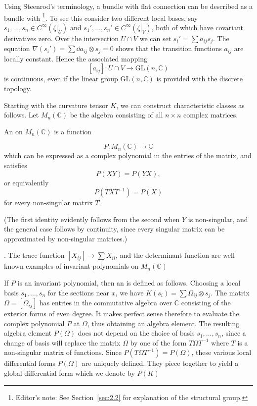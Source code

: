 \documentclass[../main]{subfiles}
\begin{document}
\begin{remark*}
Using Steenrod's terminology, a bundle with flat connection can be described as a bundle with \footnote{Editor's note: See Section~\ref{sec:2.2} for explanation of the structural group.}. To see this consider two different local bases, say $s_1,\dots,s_n \in C^{\infty}(\zeta|_U)$ and $s_1',\dots,s_n' \in C^{\infty}(\zeta|_V)$, both of which have covariant derivatives zero. Over the intersection $U\cap V$ we can set $s_i'=\sum a_{ij}s_j$. The equation $\nabla(s_i')=\sum \dd a_{ij}\otimes s_j=0$ shows that the transition functions $a_{ij}$ are locally constant. Hence the associated mapping
\[
[a_{ij}]:U \cap V \to \text{GL}(n,\mathbb C)
\]
is continuous, even if the linear group $\text{GL}(n,\mathbb C)$ is provided with the discrete topology.
\end{remark*}

Starting with the curvature tensor $K$, we can construct characteristic classes as follows. Let $M_n(\mathbb C)$ be the algebra consisting of all $n\times n$ complex matrices.

\begin{definition}
An  on $M_n(\mathbb C)$ is a function

\[
P:M_n(\mathbb C) \to \mathbb C
\]
which can be expressed as a complex polynomial in the entries of the matrix, and satisfies
\[
P(XY) = P(YX),
\]
or equivalently 
\[ 
P(TXT^{-1})=P(X)
\]
for every non-singular matrix $T$.
\end{definition}

(The first identity evidently follows from the second when $Y$ is non-singular, and the general case follows by continuity, since every singular matrix can be approximated by non-singular matrices.)

. The trace function $[X_{ij}] \to \sum X_{ii}$, and the determinant function are well known examples of invariant polynomials on $M_n(\mathbb C)$

If $P$ is an invariant polynomial, then an  is defined as follows. Choosing a local basis $s_1,\dots,s_n$ for the sections near $x$, we have $K(s_i)=\sum \Omega_{ij}\otimes s_j$. The matrix $\Omega=[\Omega_{ij}]$ has entries in the commutative algebra over $\mathbb C$ consisting of the exterior forms of even degree. It makes perfect sense therefore to evaluate the complex polynomial $P$ at $\Omega$, thus obtaining an algebra element. The resulting algebra element $P(\Omega)$ does not depend on the choice of basis $s_1,\dots,s_n$, since a change of basis will replace the matrix $\Omega$ by one of the form $T\Omega T^{-1}$ where $T$ is a non-singular matrix of functions. Since $P(T\Omega T^{-1})=P(\Omega)$, these various local differential forms $P(\Omega)$ are uniquely defined. They piece together to yield a global differential form which we denote by $P(K)$
\end{document}
